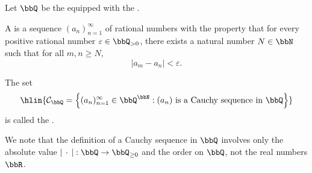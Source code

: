 \begin{definition} \label{definition:cauchy_sequence_in_rational_numbers}
    Let $\bbQ$ be the  equipped with the .

    A  is a sequence $(a_n)_{n=1}^\infty$ of rational numbers with the property that for every positive rational number $\varepsilon \in \bbQ_{> 0}$, there exists a natural number $N \in \bbN$ such that for all $m, n \ge N$,
    $$|a_m - a_n| < \varepsilon.$$

    The set
    $$\hlin{\mathcal{C}_\bbQ = \left\{ (a_n)_{n=1}^\infty \in \bbQ^\bbN : (a_n) \text{ is a Cauchy sequence in } \bbQ \right\}}$$
    is called the .

    We note that the definition of a Cauchy sequence in $\bbQ$ involves only the absolute value $|\,\cdot\,| : \bbQ \to \bbQ_{\ge 0}$ and the order on $\bbQ$, not the real numbers $\bbR$.
\end{definition}